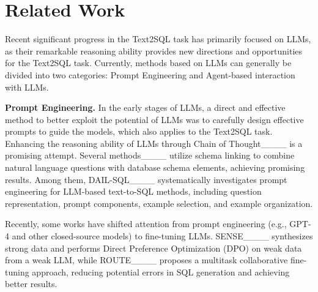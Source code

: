 \section{Related Work}
Recent significant progress in the Text2SQL task has primarily focused on LLMs, as their remarkable reasoning ability provides new directions and opportunities for the Text2SQL task. Currently, methods based on LLMs can generally be divided into two categories: Prompt Engineering and Agent-based interaction with LLMs.



\noindent \textbf{Prompt Engineering.}
In the early stages of LLMs, a direct and effective method to better exploit the potential of LLMs was to carefully design effective prompts to guide the models, which also applies to the Text2SQL task. Enhancing the reasoning ability of LLMs through Chain of Thought____ is a promising attempt. Several methods____ utilize schema linking to combine natural language questions with database schema elements, achieving promising results. Among them, DAIL-SQL____ systematically investigates prompt engineering for LLM-based text-to-SQL methods, including question representation, prompt components, example selection, and example organization. 

Recently, some works have shifted attention from prompt engineering (e.g., GPT-4 and other closed-source models) to fine-tuning LLMs. SENSE____ synthesizes strong data and performs Direct Preference Optimization (DPO) on weak data from a weak LLM, while ROUTE____ proposes a multitask collaborative fine-tuning approach, reducing potential errors in SQL generation and achieving better results.


